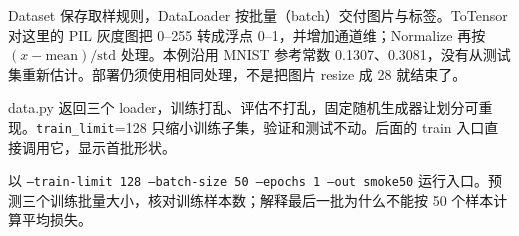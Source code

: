 Dataset 保存取样规则，DataLoader 按批量（batch）交付图片与标签。ToTensor 对这里的 PIL 灰度图把 0--255 转成浮点 0--1，并增加通道维；Normalize 再按 $(x-\mathrm{mean})/\mathrm{std}$ 处理。本例沿用 MNIST 参考常数 0.1307、0.3081，没有从测试集重新估计。部署仍须使用相同处理，不是把图片 resize 成 28 就结束了。
\begin{example}[把三个集合分开]
data.py 返回三个 loader，训练打乱、评估不打乱，固定随机生成器让划分可重现。\texttt{train\_limit}=128 只缩小训练子集，验证和测试不动。后面的 train 入口直接调用它，显示首批形状。
\end{example}
\begin{dlblock}

\end{dlblock}
\begin{exercise}\label{ex:v2-dl-data}
以 \texttt{--train-limit 128 --batch-size 50 --epochs 1 --out smoke50} 运行入口。预测三个训练批量大小，核对训练样本数；解释最后一批为什么不能按 50 个样本计算平均损失。
\end{exercise}

